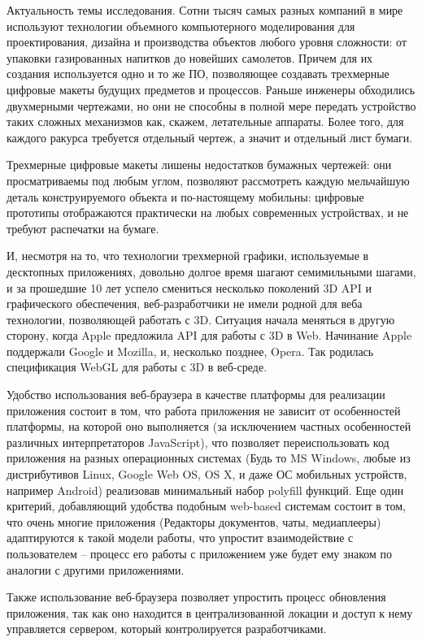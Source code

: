 Актуальность темы исследования. 
Сотни тысяч самых разных компаний в мире используют технологии объемного компьютерного моделирования для проектирования, дизайна и производства объектов любого уровня сложности: от упаковки 
газированных напитков до новейших самолетов. Причем для их создания используется одно и то же ПО, позволяющее создавать трехмерные цифровые макеты будущих предметов и процессов.
Раньше инженеры обходились двухмерными чертежами, но они не способны в полной мере передать устройство таких сложных механизмов как, скажем, летательные аппараты. Более того, для 
каждого ракурса требуется отдельный чертеж, а значит и отдельный лист бумаги.


Трехмерные цифровые макеты лишены недостатков бумажных чертежей: они просматриваемы под любым углом, позволяют рассмотреть каждую мельчайшую деталь конструируемого объекта и по-настоящему 
мобильны: цифровые прототипы отображаются практически на любых современных устройствах, и не требуют распечатки на бумаге. 

И, несмотря на то, что технологии трехмерной графики, используемые в десктопных приложениях, довольно долгое время шагают семимильными шагами, и за прошедшие 10 лет успело смениться 
несколько поколений 3D API и графического обеспечения, веб-разработчики не имели родной для веба технологии, позволяющей работать с 3D.
Ситуация начала меняться в другую сторону, когда Apple предложила API для работы с 3D в Web. Начинание Apple поддержали Google и Mozilla, и, несколько позднее, Opera. Так родилась 
спецификация WebGL для работы с 3D в веб-среде.

Удобство использования веб-браузера в качестве платформы для реализации приложения состоит в том, что работа приложения не зависит от особенностей платформы, на которой оно выполняется 
(за исключением частных особенностей различных интерпретаторов JavaScript), что позволяет переиспользовать код приложения на разных операционных системах (Будь то MS Windows, любые из 
дистрибутивов Linux, Google Web OS, OS X, и даже ОС мобильных устройств, например Android) реализовав минимальный набор polyfill функций. Еще один критерий, добавляющий удобства подобным 
web-based системам состоит в том, что очень многие приложения (Редакторы документов, чаты, медиаплееры) адаптируются к такой модели работы, что упростит взаимодействие с пользователем --
процесс его работы с приложением уже будет ему знаком по аналогии с другими приложениями. 
 
Также использование веб-браузера позволяет упростить процесс обновления приложения, так как оно 
находится в централизованной локации и доступ к нему управляется сервером, который контролируется разработчиками.

